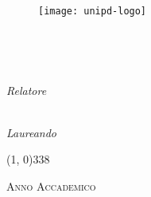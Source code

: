 \begin{titlepage}

\begin{center}

\begin{LARGE}
\textbf{\myUni}\\
\end{LARGE}

\vspace{10pt}

\begin{Large}
\textsc{\myDepartment}\\
\end{Large}

\vspace{10pt}

\begin{large}
\textsc{\myFaculty}\\
\end{large}

\vspace{50pt}
\begin{figure}[htbp]
\begin{center}
\texttt{[image: unipd-logo]}
\end{center}
\end{figure}
\vspace{15pt}

\begin{LARGE}
\begin{center}
\textbf{\myTitle}\\
\end{center}
\end{LARGE}

\vspace{10pt}

\begin{large}
\textsl{\myDegree}\\
\end{large}

\vspace{30pt}

\begin{large}
\begin{flushleft}
\textit{Relatore} \\
\vspace{5pt}
\profTitle\ \myProf
\end{flushleft}

\vspace{-43pt}

\begin{flushright}
\textit{Laureando} \\
\vspace{5pt}
\myName
\end{flushright}
\end{large}

\vspace{70pt}

\line(1, 0){338} \\
\begin{normalsize}
\textsc{Anno Accademico \myAA}
\end{normalsize}

\end{center}
\end{titlepage} 